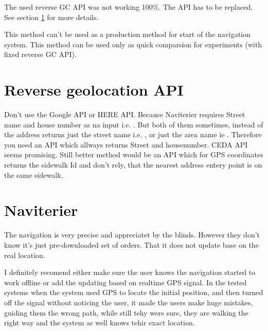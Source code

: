 \documentclass[11pt,oneside,a4paper]{book}
\begin{document}
			The used reverse GC API was not working 100\%. The API has to be replaced. See section \ref{subsec:reverse-gc-api} for more details.
						
			This method can't be used as a production method for start of the navigation system.
			This method can be used only as quick comparsion for experiments (with fixed reverse GC API).
			
		\section{Reverse geolocation API}
		\label{subsec:reverse-gc-api}
		Don't use the Google API or HERE API. Because Naviterier requires Street name and house number as na input i.e. . But both of them sometimes, instead of the address  returns just the street name i.e. , or just the area name ie . Therefore you need an API which allways returns Street and housenumber. CEDA API seems promising. Still better method would be an API which for GPS coordinates returns the sidewalk Id and don't rely, that the nearest address entery point is on the same sidewalk.	
		\section{Naviterier}
			The navigation is very precise and appreciatet by the blinds. However they don't know it's just pre-downloaded set of orders. That it does not update base on the real location.
			
			I definitely recomend either make sure the user knows the navigation started to work offline or add the updating based on realtime GPS signal. In the tested systems when the system used GPS to locate the initial position, and then turned off the signal without noticing the user, it made the users make huge mistakes, guiding them the wrong path, while still tehy were sure, they are walking the right way and the system as well knows tehir exact location.
		
	
	
	
	
	
	
	
	
	
	
		
	{
		\def\CS{$\cal C\kern-0.1667em\lower.5ex\hbox{$\cal S$}\kern-0.075em $}
		
	}
	
	
	
\end{document}
